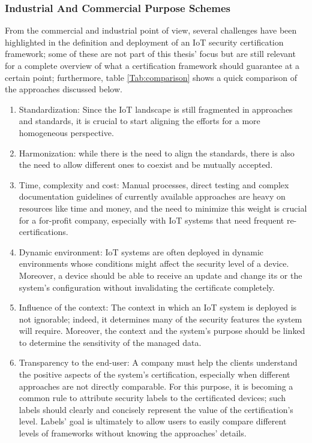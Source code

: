 \subsubsection{Industrial And Commercial Purpose Schemes}
From the commercial and industrial point of view, several challenges have been highlighted in the definition and deployment of an IoT security certification framework; some of these are not part of this thesis' focus but are still relevant for a complete overview of what a certification framework should guarantee at a certain point; furthermore, table \ref{Tab:comparison} shows a quick comparison of the approaches discussed below.
\begin{enumerate}
    \item Standardization: Since the IoT landscape is still fragmented in approaches and standards, it is crucial to start aligning the efforts for a more homogeneous perspective.


    \item Harmonization: while there is the need to align the standards, there is also the need to allow different ones to coexist and be mutually accepted.


    \item Time, complexity and cost: Manual processes, direct testing and complex documentation guidelines of currently available approaches are heavy on resources like time and money, and the need to minimize this weight is crucial for a for-profit company, especially with IoT systems that need frequent re-certifications.


    \item Dynamic environment: IoT systems are often deployed in dynamic environments whose conditions might affect the security level of a device. Moreover, a device should be able to receive an update and change its or the system's configuration without invalidating the certificate completely.


    \item Influence of the context: The context in which an IoT system is deployed is not ignorable; indeed, it determines many of the security features the system will require. Moreover, the context and the system's purpose should be linked to determine the sensitivity of the managed data.


    \item Transparency to the end-user: A company must help the clients understand the positive aspects of the system's certification, especially when different approaches are not directly comparable. For this purpose, it is becoming a common rule to attribute security labels to the certificated devices; such labels should clearly and concisely represent the value of the certification's level. Labels' goal is ultimately to allow users to easily compare different levels of frameworks without knowing the approaches' details.



\end{enumerate}
